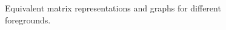 \begin{figure}[p]
  \begin{center}
    
    \caption{Equivalent matrix representations and graphs for different foregrounds.}
    \label{fig:fragments}
  \end{center}
\end{figure}
